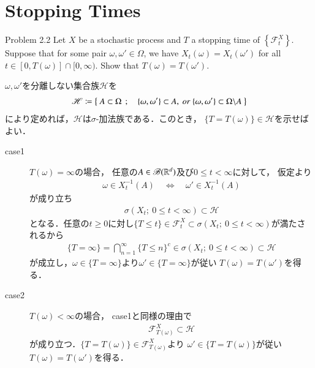 \section{Stopping Times}
	\begin{itembox}[l]{Problem 2.2}
		Let $X$ be a stochastic process and $T$ a stopping time of 
		$\left\{ \mathscr{F}^X_t \right\}$. Suppose that for some pair $\omega,\omega' \in \Omega$, 
		we have $X_t(\omega) = X_t(\omega')$ for all $t \in [0,T(\omega)] \cap [0,\infty)$. 
		Show that $T(\omega) = T(\omega')$. 
	\end{itembox}
	
	\begin{prf}
		$\omega,\omega'$を分離しない集合族$\mathscr{H}$を
		\begin{align}
			\mathscr{H} \coloneqq \left\{\ A \subset \Omega\ \, ; \quad \{\omega,\omega'\} \subset A,\ or\ \{\omega,\omega'\} \subset \Omega \backslash A\ \right\}
		\end{align}
		により定めれば，$\mathscr{H}$は$\sigma$-加法族である．このとき，
		$\{T = T(\omega)\} \in \mathscr{H}$を示せばよい．
		\begin{description}
			\item[case1]
				$T(\omega) = \infty$の場合，
				任意の$A \in \mathscr{B}(\mathbb{R}^d)$及び$0 \leq t < \infty$に対して，
				仮定より
				\begin{align}
					\omega \in X_t^{-1}(A) \quad \Leftrightarrow \quad
					\omega' \in X_t^{-1}(A)
				\end{align}
				が成り立ち
				\begin{align}
					\sigma(X_t;\ 0 \leq t < \infty) \subset \mathscr{H}
				\end{align}
				となる．任意の$t \geq 0$に対し$\{T \leq t\} \in \mathscr{F}^X_t \subset 
				\sigma(X_t;\ 0 \leq t < \infty)$が満たされるから
				\begin{align}
					\{T = \infty\} = \bigcap_{n=1}^\infty \{T \leq n\}^c
					\in \sigma(X_t;\ 0 \leq t < \infty) \subset \mathscr{H}
				\end{align}
				が成立し，$\omega \in \{T = \infty\}$より$\omega' \in \{T = \infty\}$が従い
				$T(\omega) = T(\omega')$を得る．
				
			\item[case2]
				$T(\omega) < \infty$の場合，
				case1と同様の理由で
				\begin{align}
					\mathscr{F}^X_{T(\omega)} \subset \mathscr{H}
				\end{align}
				が成り立つ．$\{T = T(\omega)\} \in \mathscr{F}^X_{T(\omega)}$より
				$\omega' \in \{T = T(\omega)\}$が従い$T(\omega) = T(\omega')$を得る．
				\QED
		\end{description}
	\end{prf}